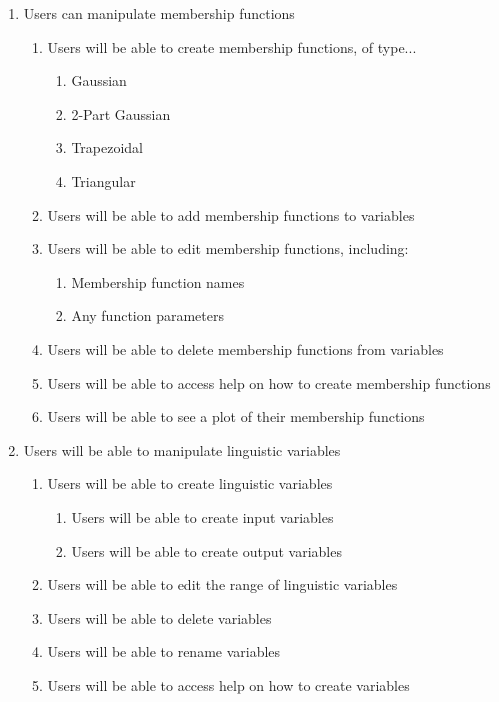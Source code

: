 \begin{enumerate}
\item Users can manipulate membership functions
	\begin{enumerate}[label*=\arabic*.]
		\item Users will be able to create membership functions, of type...
		\begin{enumerate}[label*=\arabic*.]
			\item Gaussian
			\item 2-Part Gaussian 
			\item Trapezoidal
			\item Triangular
		\end{enumerate}
		\item Users will be able to add membership functions to variables	
		\item Users will be able to edit membership functions, including:
			\begin{enumerate}[label*=\arabic*.]
			\item Membership function names
			\item Any function parameters
			\end{enumerate}
		\item Users will be able to delete membership functions from variables
		\item Users will be able to access help on how to create membership functions
		\item Users will be able to see a plot of their membership functions
	\end{enumerate}
	
\item Users will be able to manipulate linguistic variables
	\begin{enumerate}[label*=\arabic*.]
		\item Users will be able to create linguistic variables
			\begin{enumerate}[label*=\arabic*.]
				\item Users will be able to create input variables
				\item Users will be able to create output variables
			\end{enumerate}	
		\item Users will be able to edit the range of linguistic variables
		\item Users will be able to delete variables
		\item Users will be able to rename variables
		\item Users will be able to access help on how to create variables
	\end{enumerate}
	

\end{enumerate}
